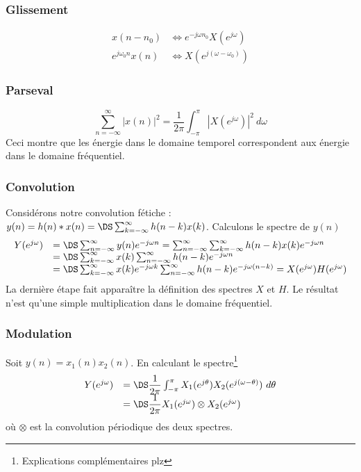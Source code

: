 		\subsubsection{Glissement}
		\begin{equation}
		\begin{array}{ll}
		x(n-n_0) &\Leftrightarrow e^{-j\omega n_0}X(e^{j\omega})\\
		e^{j\omega_0n}x(n) &\Leftrightarrow X\left(e^{j(\omega-\omega_0)}\right)
		\end{array}		
		\end{equation}


		\subsubsection{Parseval}
		\begin{equation}
		\sum_{n=-\infty}^\infty |x(n)|^2 = \dfrac{1}{2\pi}\int_{-\pi}^\pi \left|X(e^{j\omega})\right|^2\ 
		d\omega
		\end{equation}
		Ceci montre que les énergie dans le domaine temporel correspondent aux énergie dans le 
		domaine fréquentiel. 
		
		\subsubsection{Convolution}
		Considérons notre convolution fétiche : $y(n) = h(n)*x(n) = \DS \sum_{k=-\infty}^\infty 
		h(n-k)x(k)$. Calculons le spectre de $y(n)$
		\begin{equation}
		\begin{array}{ll}
		Y(e^{j\omega}) &= \DS \sum_{n=-\infty}^\infty y(n)e^{-j\omega n} = \sum_{n=-\infty}^\infty
		\sum_{k=-\infty}^\infty h(n-k)x(k)e^{-j\omega n}\\
		&= \DS\sum_{k=-\infty}^\infty x(k) \sum_{n=-\infty}^\infty h(n-k)e^{-j\omega n}\\
		&= \DS \sum_{k=-\infty}^\infty x(k)e^{-j\omega k} \sum_{n=-\infty}^\infty h(n-k)
		e^{-j\omega(n-k)} = X(e^{j\omega})H(e^{j\omega})
		\end{array}
		\end{equation}
		La dernière étape fait apparaître la définition des spectres $X$ et $H$. Le résultat 
		n'est qu'une simple multiplication dans le domaine fréquentiel.
		
		\subsubsection{Modulation}
		Soit $y(n) = x_1(n)x_2(n)$. En calculant le spectre\footnote{Explications complémentaires plz}
		\begin{equation}
		\begin{array}{ll}
		Y(e^{j\omega}) &= \DS \dfrac{1}{2\pi}\int_{-\pi}^\pi X_1(e^{j\theta})X_2(e^{j(\omega-\theta)})\ 
		d\theta\\
		&= \DS \dfrac{1}{2\pi}X_1(e^{j\omega}) \otimes X_2(e^{j\omega})
		\end{array}
		\end{equation}
		où $\otimes$ est la convolution périodique des deux spectres.



